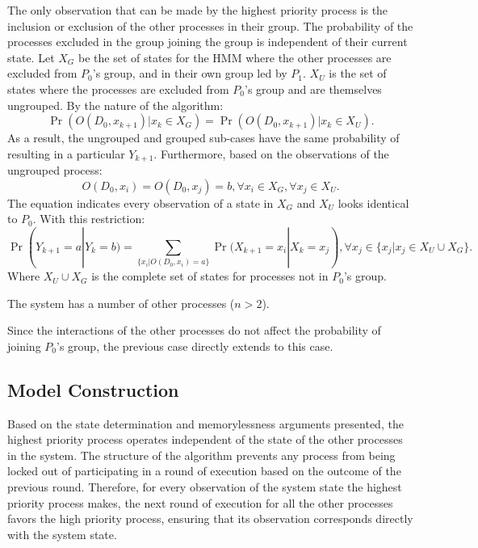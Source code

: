 \begin{prooftight}
The only observation that can be made by the highest priority process is the inclusion or exclusion of the other processes in their group.
The probability of the processes excluded in the group joining the group is independent of their current state.
Let $X_G$ be the set of states for the \ac{HMM} where the other processes are excluded from $P_0$'s group, and in their own group led by $P_1$.
$X_U$ is the set of states where the processes are excluded from $P_0$'s group and are themselves ungrouped.
By the nature of the algorithm: 
\begin{equation}
\Pr(O(D_0, x_{k+1}) | x_k \in X_G) = \Pr(O(D_0, x_{k+1}) | x_k \in X_U).
\label{eq:sameprob}
\end{equation}
As a result, the ungrouped and grouped sub-cases have the same probability of resulting in a particular $Y_{k+1}$.
Furthermore, based on the observations of the ungrouped process:
\begin{equation}
O(D_0, x_i) = O(D_0, x_j) = b, \forall x_i \in X_G, \forall x_j \in X_U.
\end{equation}
The equation indicates every observation of a state in $X_G$ and $X_U$ looks identical to $P_0$.
With this restriction:
\begin{equation}
    \Pr(Y_{k+1}=a | Y_{k}=b) = \sum_{\{x_{i} | O(D_0, x_{i}) = a\}} \Pr(X_{k+1}=x_i | X_{k}=x_j), \forall x_j \in \{x_j | x_j \in X_U \cup X_G\}.
\end{equation}
Where $X_U \cup X_G$ is the complete set of states for processes not in $P_0$'s group.

\begin{case}
    The system has a number of other processes ($n > 2$).
\end{case}
Since the interactions of the other processes do not affect the probability of joining $P_0$'s group, the previous case directly extends to this case.

\end{prooftight}

\subsection{Model Construction}

Based on the state determination and memorylessness arguments presented, the highest priority process operates independent of the state of the other processes in the system.
The structure of the algorithm prevents any process from being locked out of participating in a round of execution based on the outcome of the previous round.
Therefore, for every observation of the system state the highest priority process makes, the next round of execution for all the other processes favors the high priority process, ensuring that its observation corresponds directly with the system state.

